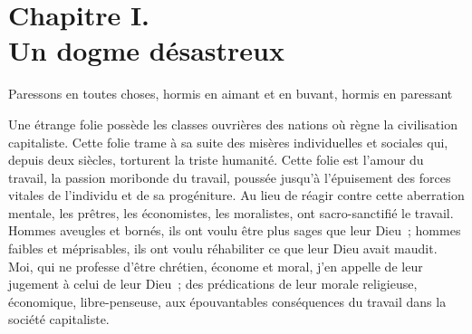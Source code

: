 \documentclass[french,twoside]{book} %
\newcommand{\bibl}[1]{{\RaggedLeft{#1}\par\bigskip}}
\newcommand\chapteropen{} %
\newcommand\chaptercont{} %
\begin{document}
\chapteropen
\chapter[{Chapitre I. Un dogme désastreux}]{Chapitre I. \\
Un dogme désastreux}\renewcommand{\leftmark}{Chapitre I. \\
Un dogme désastreux}

\noindent Paressons en toutes choses, hormis en aimant et en buvant, hormis en paressant\par

\bibl{Lessing.}

\chaptercont
\noindent Une étrange folie possède les classes ouvrières des nations où règne la civilisation capitaliste. Cette folie trame à sa suite des misères individuelles et sociales qui, depuis deux siècles, torturent la triste humanité. Cette folie est l’amour du travail, la passion moribonde du travail, poussée jusqu’à l’épuisement des forces vitales de l’individu et de sa progéniture. Au lieu de réagir contre cette aberration mentale, les prêtres, les économistes, les moralistes, ont sacro-sanctifié le travail. Hommes aveugles et bornés, ils ont voulu être plus sages que leur Dieu ; hommes faibles et méprisables, ils ont voulu réhabiliter ce que leur Dieu avait maudit. Moi, qui ne professe d’être chrétien, économe et moral, j’en appelle de leur jugement à celui de leur Dieu ; des prédications de leur morale religieuse, économique, libre-penseuse, aux épouvantables conséquences du travail dans la société capitaliste.\par
\end{document}
